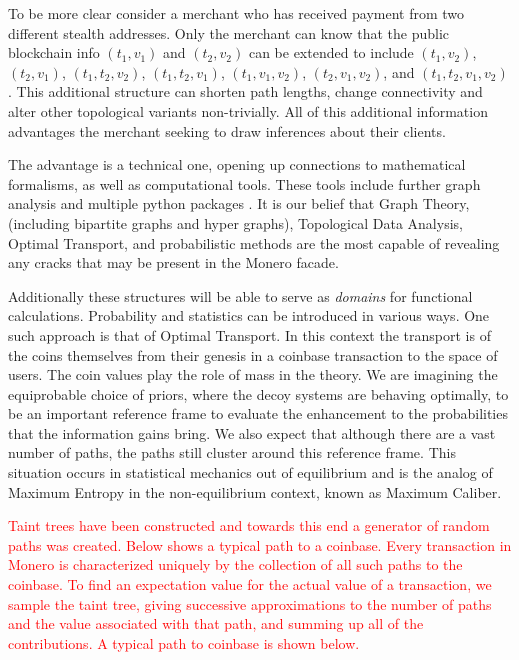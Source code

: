 \documentclass[prc, 12pt]{revtex4-1}
\begin{document}
To be more clear consider a merchant who has received payment from two different stealth addresses.  Only the merchant can know that the public blockchain info $(t_1, v_1)$ and $(t_2, v_2)$ can be extended to include $(t_1, v_2)$, $(t_2, v_1)$, $(t_1, t_2, v_2)$, $(t_1, t_2, v_1)$, $(t_1, v_1, v_2)$, $(t_2, v_1, v_2)$, and $(t_1, t_2, v_1, v_2)$.  This additional structure can shorten path lengths, change connectivity and alter other topological variants non-trivially.  All of this additional information advantages the merchant seeking to draw inferences about their clients.

The advantage is a technical one, opening up connections to mathematical formalisms, as well as computational tools.  These tools include further graph analysis \cite{ranshous2017exchange, hagberg2020networkx} and multiple python packages \cite{tauzin2021giotto, flamary2021pot}.   It is our belief that Graph Theory, (including bipartite graphs and hyper graphs), Topological Data Analysis, Optimal Transport, and probabilistic methods are the most capable of revealing any cracks that may be present in the Monero facade.  

Additionally these structures will be able to serve as \textit{domains} for functional calculations.  Probability and statistics can be introduced in various ways.  One such approach is that of Optimal Transport.  In this context the transport is of the coins themselves from their genesis in a coinbase transaction to the space of users.  The coin values play the role of mass in the theory.  We are imagining the equiprobable choice of priors, where the decoy systems are behaving optimally, to be an important reference frame to evaluate the enhancement to the probabilities that the information gains bring.  We also expect that although there are a vast number of paths, the paths still cluster around this reference frame.  This situation occurs in statistical mechanics out of equilibrium and is the analog of Maximum Entropy in the non-equilibrium context, known as Maximum Caliber.

\textcolor{red}{Taint trees have been constructed and towards this end a generator of random paths was created.  Below shows a typical path to a coinbase.  Every transaction in Monero is characterized uniquely by the collection of all such paths to the coinbase.  To find an expectation value for the actual value of a transaction, we sample the taint tree, giving successive approximations to the number of paths and the value associated with that path, and summing up all of the contributions.  A typical path to coinbase is shown below.}
\end{document}
